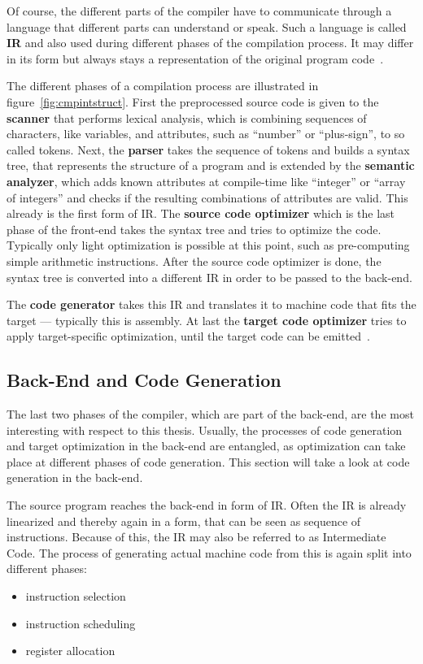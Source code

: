 {Of course, the different parts of the compiler have to communicate through a language that different parts can understand or speak.
Such a language is called \textbf{\ac{IR}} and also used during different phases of the compilation process.
It may differ in its form but always stays a representation of the original program code~\cite[p.~8]{UBHD-67548259}.

The different phases of a compilation process are illustrated in figure~\ref{fig:cmpintstruct}.
First the preprocessed source code is given to the \textbf{scanner} that performs lexical analysis, which is combining sequences of characters, like variables, and attributes, such as ``number'' or ``plus-sign'', to so called tokens.
Next, the \textbf{parser} takes the sequence of tokens and builds a syntax tree, that represents the structure of a program and is extended by the \textbf{semantic analyzer}, which adds known attributes at compile-time like ``integer'' or ``array of integers'' and checks if the resulting combinations of attributes are valid.
This already is the first form of \ac{IR}.
The \textbf{source code optimizer} which is the last phase of the front-end takes the syntax tree and tries to optimize the code.
Typically only light optimization is possible at this point, such as pre-computing simple arithmetic instructions.
After the source code optimizer is done, the syntax tree is converted into a different \ac{IR} in order to be passed to the back-end.

The \textbf{code generator} takes this \ac{IR} and translates it to machine code that fits the target --- typically this is assembly.
At last the \textbf{target code optimizer} tries to apply target-specific optimization, until the target code can be emitted~\cite{UBHD-67548259, UBHD-66483012}.

\subsection{Back-End and Code Generation}
The last two phases of the compiler, which are part of the back-end, are the most interesting with respect to this thesis.
Usually, the processes of code generation and target optimization in the back-end are entangled, as optimization can take place at different phases of code generation.
This section will take a look at code generation in the back-end.

The source program reaches the back-end in form of \ac{IR}.
Often the \ac{IR} is already linearized and thereby again in a form, that can be seen as sequence of instructions.
Because of this, the \ac{IR} may also be referred to as Intermediate Code.
The process of generating actual machine code from this is again split into different phases:
\begin{itemize}
    \item instruction selection
    \item instruction scheduling
    \item register allocation
\end{itemize}

}
